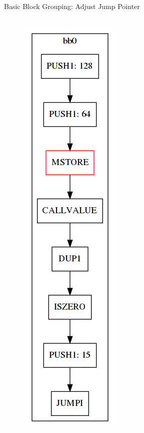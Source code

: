 \documentclass[11pt]{beamer}
\begin{document}
\begin{frame}{Basic Block Grouping: Adjust Jump Pointer}
\begin{columns}
{\begin{figure}
        \includegraphics[scale=0.25]{figures/stack/cfg_stack3.png}
    \end{figure}
}
\end{columns}
\end{frame}
\end{document}
